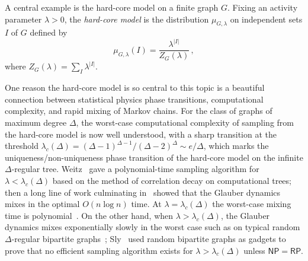 \documentclass[10pt]{amsart}
\begin{document}
	A central  example is the hard-core model on a finite graph $G$.  Fixing an activity parameter $\lambda>0$, the \emph{hard-core model} is the distribution $\mu_{G,\lambda}$ on independent sets 
	$I$ of $G$ defined by 
	\[
	\mu_{G,\lambda}(I)= \frac{\lambda^{|I|}}{Z_G(\lambda)}\, ,
	\]
	where $Z_G(\lambda)=\sum_I \lambda^{|I|}$. 
	
	
	
	One reason the hard-core model is so central to this topic is a beautiful connection between statistical physics phase transitions, computational complexity, and rapid mixing of Markov chains.
	For the class of graphs of maximum degree $\Delta$, the worst-case computational complexity of sampling from the hard-core model is now well understood, with a sharp transition at the  threshold $\lambda_c(\Delta) = (\Delta-1)^{\Delta-1}/(\Delta-2)^\Delta \sim e/\Delta$, which marks the uniqueness/non-uniqueness phase transition of the hard-core model on the infinite $\Delta$-regular tree.  Weitz~\cite{Wei06} gave a polynomial-time  sampling algorithm for $\lambda < \lambda_c(\Delta)$ based on the method of correlation decay on computational trees; then a long line of work culminating in~\cite{ALO20, CLV23,CLV21}  showed that the 
	Glauber dynamics mixes in the optimal $O(n\log n)$ time. At $\lambda=\lambda_c(\Delta)$ the worst-case mixing time is polynomial~\cite{chen2025rapid-unique}. 
	On the other hand, when $\lambda> \lambda_c(\Delta)$, the Glauber dynamics mixes exponentially slowly in the 
	worst case such as on typical random $\Delta$-regular bipartite graphs~\cite{MWW09}; 
	Sly~\cite{Sly10} used random bipartite graphs as gadgets to prove that no efficient sampling algorithm  exists for $\lambda > \lambda_c(\Delta)$ unless $\mathsf{NP}=\mathsf{RP}$. 
	
\end{document}
